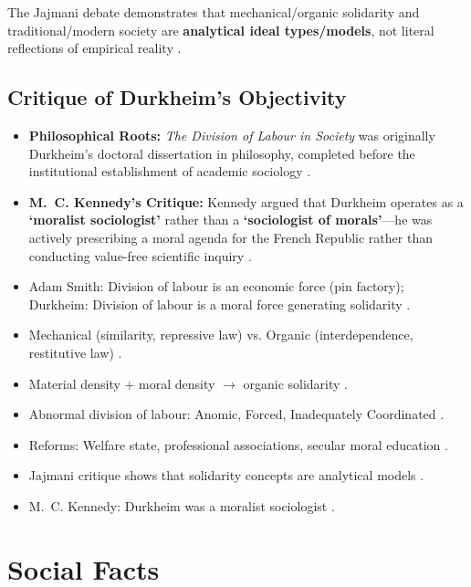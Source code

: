 \begin{ComparisonBox}
The Jajmani debate demonstrates that mechanical/organic solidarity and traditional/modern society are \textbf{analytical ideal types/models}, not literal reflections of empirical reality .
\end{ComparisonBox}

\subsection{Critique of Durkheim's Objectivity}
\begin{itemize}
    \item \textbf{Philosophical Roots:} \textit{The Division of Labour in Society} was originally Durkheim's doctoral dissertation in philosophy, completed before the institutional establishment of academic sociology .
    \item \textbf{M.~C. Kennedy's Critique:} Kennedy argued that Durkheim operates as a \textbf{`moralist sociologist'} rather than a \textbf{`sociologist of morals'}---he was actively prescribing a moral agenda for the French Republic rather than conducting value-free scientific inquiry .
\end{itemize}

\begin{QuickRevision}
\begin{itemize}
    \item Adam Smith: Division of labour is an economic force (pin factory); Durkheim: Division of labour is a moral force generating solidarity .
    \item Mechanical (similarity, repressive law) vs. Organic (interdependence, restitutive law) .
    \item Material density + moral density $\rightarrow$ organic solidarity .
    \item Abnormal division of labour: Anomic, Forced, Inadequately Coordinated .
    \item Reforms: Welfare state, professional associations, secular moral education .
    \item Jajmani critique shows that solidarity concepts are analytical models .
    \item M.~C. Kennedy: Durkheim was a moralist sociologist .
\end{itemize}
\end{QuickRevision}

\sectiondivider

\section{Social Facts}

